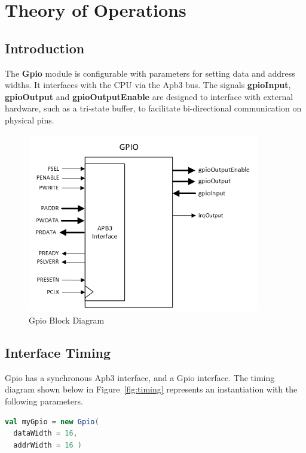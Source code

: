 \section{Theory of Operations}

\subsection{Introduction}
The \textbf{Gpio} module is configurable with parameters for setting data and address widths. It interfaces with the CPU via the Apb3 bus. The signals \textbf{gpioInput}, \textbf{gpioOutput} and \textbf{gpioOutputEnable} are designed to interface with external hardware, such as a tri-state buffer, to facilitate bi-directional communication on physical pins.

\begin{figure}[h]
  \includegraphics[width=0.90\textwidth]{images/block-diagram-gpio.png}
  \caption{Gpio Block Diagram}\label{fig:block-diagram}
\end{figure}

\newpage
\subsection{Interface Timing}

Gpio has a synchronous Apb3 interface, and a Gpio interface. The timing diagram shown below
in Figure~\ref{fig:timing} represents an instantiation with the following
parameters.

\begin{lstlisting}[language=Scala]
val myGpio = new Gpio(
  dataWidth = 16, 
  addrWidth = 16 ) 
\end{lstlisting}

